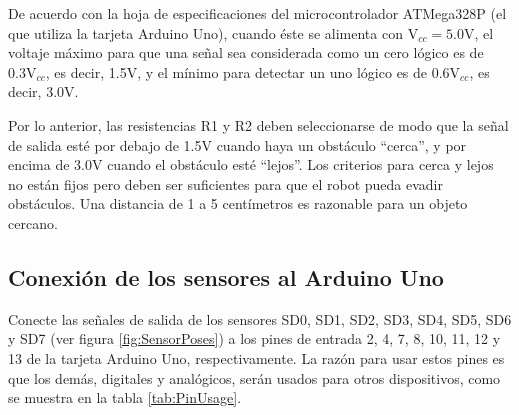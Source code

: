 \documentclass[a4paper,12pt]{article}
\begin{document}
De acuerdo con la hoja de especificaciones del microcontrolador ATMega328P (el que utiliza la tarjeta Arduino Uno), cuando éste se alimenta con $\textrm{V}_{cc}=5.0\textrm{V}$, el voltaje máximo para que una señal sea considerada como un cero lógico es de $0.3\textrm{V}_{cc}$, es decir, 1.5V, y el mínimo para detectar un uno lógico es de $0.6\textrm{V}_{cc}$, es decir, 3.0V. 

Por lo anterior, las resistencias R1 y R2 deben seleccionarse de modo que la señal de salida esté por debajo de 1.5V cuando haya un obstáculo ``cerca'', y por encima de 3.0V cuando el obstáculo esté ``lejos''. Los criterios para cerca y lejos no están fijos pero deben ser suficientes para que el robot pueda evadir obstáculos. Una distancia de 1 a 5 centímetros es razonable para un objeto cercano. 

\subsection{Conexión de los sensores al Arduino Uno}
Conecte las señales de salida de los sensores SD0, SD1, SD2, SD3, SD4, SD5, SD6 y SD7 (ver figura \ref{fig:SensorPoses}) a los pines de entrada 2, 4, 7, 8, 10, 11, 12 y 13 de la tarjeta Arduino Uno, respectivamente. La razón para usar estos pines es que los demás, digitales y analógicos, serán usados para otros dispositivos, como se muestra en la tabla \ref{tab:PinUsage}.
\end{document}
